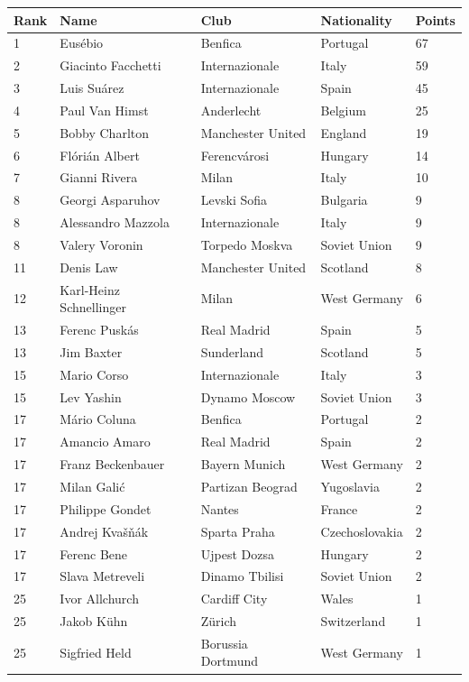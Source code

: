 \documentclass{article}
\begin{document}
\begin{tabular}{lllll}
\toprule
Rank & Name & Club & Nationality & Points \\
\midrule
1 & Eusébio & Benfica & Portugal & 67 \\
2 & Giacinto Facchetti & Internazionale & Italy & 59 \\
3 & Luis Suárez & Internazionale & Spain & 45 \\
4 & Paul Van Himst & Anderlecht & Belgium & 25 \\
5 & Bobby Charlton & Manchester United & England & 19 \\
6 & Flórián Albert & Ferencvárosi & Hungary & 14 \\
7 & Gianni Rivera & Milan & Italy & 10 \\
8 & Georgi Asparuhov & Levski Sofia & Bulgaria & 9 \\
8 & Alessandro Mazzola & Internazionale & Italy & 9 \\
8 & Valery Voronin & Torpedo Moskva & Soviet Union & 9 \\
11 & Denis Law & Manchester United & Scotland & 8 \\
12 & Karl-Heinz Schnellinger & Milan & West Germany & 6 \\
13 & Ferenc Puskás & Real Madrid & Spain & 5 \\
13 & Jim Baxter & Sunderland & Scotland & 5 \\
15 & Mario Corso & Internazionale & Italy & 3 \\
15 & Lev Yashin & Dynamo Moscow & Soviet Union & 3 \\
17 & Mário Coluna & Benfica & Portugal & 2 \\
17 & Amancio Amaro & Real Madrid & Spain & 2 \\
17 & Franz Beckenbauer & Bayern Munich & West Germany & 2 \\
17 & Milan Galić & Partizan Beograd & Yugoslavia & 2 \\
17 & Philippe Gondet & Nantes & France & 2 \\
17 & Andrej Kvašňák & Sparta Praha & Czechoslovakia & 2 \\
17 & Ferenc Bene & Ujpest Dozsa & Hungary & 2 \\
17 & Slava Metreveli & Dinamo Tbilisi & Soviet Union & 2 \\
25 & Ivor Allchurch & Cardiff City & Wales & 1 \\
25 & Jakob Kühn & Zürich & Switzerland & 1 \\
25 & Sigfried Held & Borussia Dortmund & West Germany & 1 \\
\bottomrule
\end{tabular}
\end{document}
